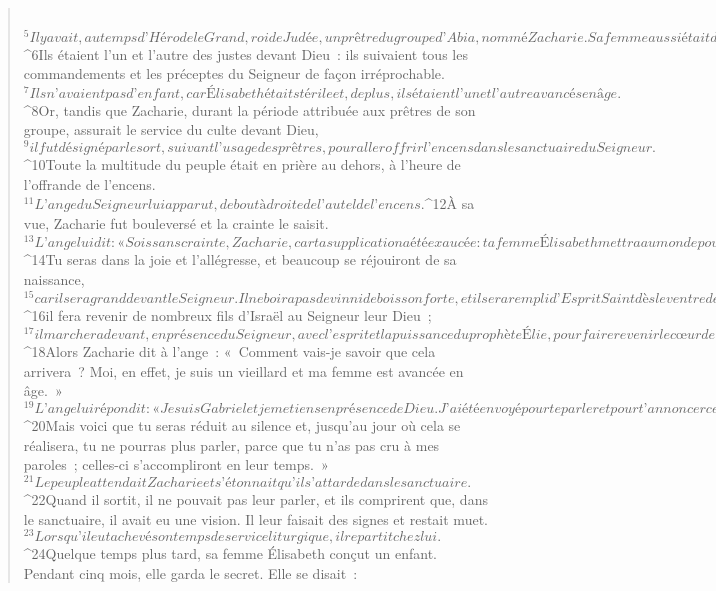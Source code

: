 \begin{verse}
         
${}^{5}Il y avait, au temps d’Hérode le Grand, roi de Judée, un prêtre du groupe d’Abia, nommé Zacharie. Sa femme aussi était descendante d’Aaron ; elle s’appelait Élisabeth. 
${}^{6}Ils étaient l’un et l’autre des justes devant Dieu : ils suivaient tous les commandements et les préceptes du Seigneur de façon irréprochable. 
${}^{7}Ils n’avaient pas d’enfant, car Élisabeth était stérile et, de plus, ils étaient l’un et l’autre avancés en âge.
${}^{8}Or, tandis que Zacharie, durant la période attribuée aux prêtres de son groupe, assurait le service du culte devant Dieu, 
${}^{9}il fut désigné par le sort, suivant l’usage des prêtres, pour aller offrir l’encens dans le sanctuaire du Seigneur. 
${}^{10}Toute la multitude du peuple était en prière au dehors, à l’heure de l’offrande de l’encens. 
${}^{11}L’ange du Seigneur lui apparut, debout à droite de l’autel de l’encens. 
${}^{12}À sa vue, Zacharie fut bouleversé et la crainte le saisit.
${}^{13}L’ange lui dit : « Sois sans crainte, Zacharie, car ta supplication a été exaucée : ta femme Élisabeth mettra au monde pour toi un fils, et tu lui donneras le nom de Jean. 
${}^{14}Tu seras dans la joie et l’allégresse, et beaucoup se réjouiront de sa naissance, 
${}^{15}car il sera grand devant le Seigneur. Il ne boira pas de vin ni de boisson forte, et il sera rempli d’Esprit Saint dès le ventre de sa mère ; 
${}^{16}il fera revenir de nombreux fils d’Israël au Seigneur leur Dieu ; 
${}^{17}il marchera devant, en présence du Seigneur, avec l’esprit et la puissance du prophète Élie, pour faire revenir le cœur des pères vers leurs enfants, ramener les rebelles à la sagesse des justes, et préparer au Seigneur un peuple bien disposé. » 
${}^{18}Alors Zacharie dit à l’ange : « Comment vais-je savoir que cela arrivera ? Moi, en effet, je suis un vieillard et ma femme est avancée en âge. » 
${}^{19}L’ange lui répondit : « Je suis Gabriel et je me tiens en présence de Dieu. J’ai été envoyé pour te parler et pour t’annoncer cette bonne nouvelle. 
${}^{20}Mais voici que tu seras réduit au silence et, jusqu’au jour où cela se réalisera, tu ne pourras plus parler, parce que tu n’as pas cru à mes paroles ; celles-ci s’accompliront en leur temps. »
${}^{21}Le peuple attendait Zacharie et s’étonnait qu’il s’attarde dans le sanctuaire. 
${}^{22}Quand il sortit, il ne pouvait pas leur parler, et ils comprirent que, dans le sanctuaire, il avait eu une vision. Il leur faisait des signes et restait muet. 
${}^{23}Lorsqu’il eut achevé son temps de service liturgique, il repartit chez lui. 
${}^{24}Quelque temps plus tard, sa femme Élisabeth conçut un enfant. Pendant cinq mois, elle garda le secret. Elle se disait : 

\end{verse}
